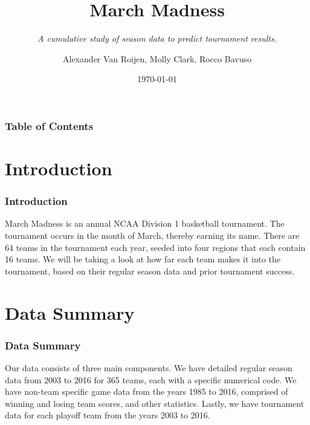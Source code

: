 \documentclass[11pt]{beamer}
\begin{document}
	\author{\footnotesize Alexander Van Roijen, Molly Clark, Rocco Bavuso}
	\title{{\textbf{\huge March Madness}}}
	\subtitle{{\textit{\footnotesize A cumulative study of season data to predict tournament results.}}}
	\date{\today}
	\begin{frame}[plain]
	\maketitle
\end{frame}
\begin{frame}
\frametitle{\textbf{\huge Table of Contents}}
\tableofcontents
\end{frame}
\section{Introduction}
\begin{frame}
\frametitle{{\textbf{\huge Introduction}}}
\begin{center}
March Madness is an annual NCAA Division 1 basketball tournament. The tournament occurs in the month of March, thereby earning its name. There are 64 teams in the tournament each year, seeded into four regions that each contain 16 teams. We will be taking a look at how far each team makes it into the tournament, based on their regular season data and prior tournament success.
\end{center}
\end{frame}
\section{Data Summary}
\begin{frame}
\frametitle{{\textbf{\huge Data Summary}}}
\center Our data consists of three main components. We have detailed regular season data from 2003 to 2016 for 365 teams, each with a specific numerical code. We have non-team specific game data from the years 1985 to 2016, comprised of winning and losing team scores, and other statistics. Lastly, we have tournament data  for each playoff team from the years 2003 to 2016.
\end{frame}
\end{document}
